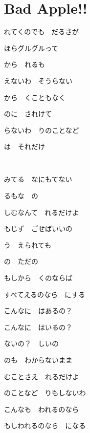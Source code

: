 \section{Bad Apple!!}

れてくのでも　だるさが

ほらグルグルって

から　れるも

えないわ　そうらない

から　くこともなく

のに　されけて

らないわ　りのことなど

は　それだけ

~

みてる　なにもてない

るもな　の

しむなんて　れるだけよ

もじず　ごせばいいの

う　えられても

の　ただの

もしから　くのならば

すべてえるのなら　にする

こんなに　はあるの？

こんなに　はいるの？

ないの？　しいの

のも　わからないまま

むことさえ　れるだけよ

のことなど　りもしないわ

こんなも　われるのなら

もしわれるのなら　になる

